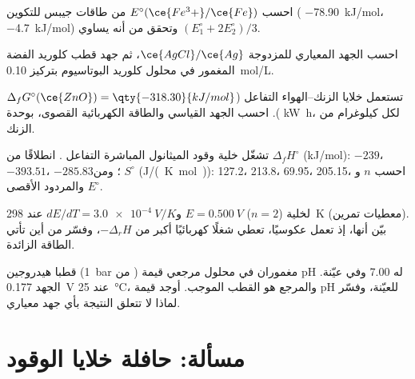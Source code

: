 \begin{exercise}[$\star\star$]\label{exo:b2:cell-thermodynamics:7}
احسب $E^\circ(\ce{Fe^3+}/\ce{Fe})$ من طاقات جيبس للتكوين
( \qty{-78.90}{kJ/mol}،  \qty{-4.7}{kJ/mol}) وتحقق من أنه
يساوي $(E_1^\circ + 2E_2^\circ)/3$.
\end{exercise}

\begin{exercise}[$\star\star$]\label{exo:b2:cell-thermodynamics:8}
احسب الجهد المعياري للمزدوجة $\ce{AgCl}/\ce{Ag}$، ثم
جهد قطب كلوريد الفضة المغمور في محلول كلوريد البوتاسيوم بتركيز \qty{0.10}{mol/L}.
\end{exercise}

\begin{exercise}[$\star\star$]\label{exo:b2:cell-thermodynamics:9}
تستعمل خلايا الزنك--الهواء التفاعل  ($\Delta_f G^\circ(\ce{ZnO}) =
\qty{-318.30}{kJ/mol}$). احسب الجهد القياسي والطاقة الكهربائية
القصوى، بوحدة \unit{kW.h}، لكل كيلوغرام من الزنك.
\end{exercise}

\begin{exercise}[$\star\star\star$]\label{exo:b2:cell-thermodynamics:10}
تشغّل خلية وقود الميثانول المباشرة التفاعل . انطلاقًا من
$\Delta_f H^\circ$ (\unit{kJ/mol}):  $-239$،  $-393.51$،
 $-285.83$؛ ومن $S^\circ$ (\unit{J/(K.mol)}):  127.2،
 213.8،  69.95،  205.15، احسب $n$ و$E^\circ$ 
والمردود الأقصى.
\end{exercise}

\begin{exercise}[$\star\star\star$]\label{exo:b2:cell-thermodynamics:11}
لخلية ($n = 2$) $E = \qty{0.500}{V}$ و$dE/dT = \qty{+3.0e-4}{V/K}$ عند
\qty{298}{K} (معطيات تمرين). بيّن أنها، إذ تعمل عكوسيًا، تعطي شغلًا
كهربائيًا أكبر من $-\Delta_r H$، وفسّر من أين تأتي الطاقة الزائدة.
\end{exercise}

\begin{exercise}[$\star\star\star$]\label{exo:b2:cell-thermodynamics:12}
قطبا هيدروجين (\qty{1}{bar} من ) مغموران في محلول مرجعي
قيمة pH له 7.00 وفي عيّنة. الجهد \qty{0.177}{V} عند \qty{25}{\degreeCelsius}،
والمرجع هو القطب الموجب. أوجد قيمة pH للعيّنة، وفسّر
لماذا لا تتعلق النتيجة بأي جهد معياري.
\end{exercise}

\section{مسألة: حافلة خلايا الوقود}

